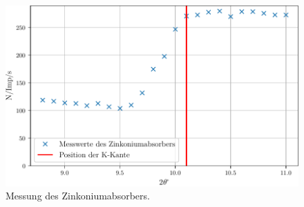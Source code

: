 \begin{figure}
  \centering
  \includegraphics{build/zinkonium.pdf}
  \caption{Messung des Zinkoniumabsorbers.}
  \label{fig:zinkonium}
\end{figure}